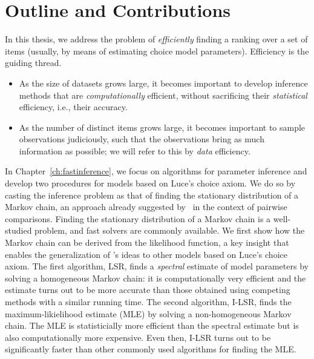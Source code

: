 \section{Outline and Contributions}
\label{in:sec:outline}

In this thesis, we address the problem of \emph{efficiently} finding a ranking over a set of items (usually, by means of estimating choice model parameters).
Efficiency is the guiding thread.
\begin{itemize}
\item As the size of datasets grows large, it becomes important to develop inference methods that are \emph{computationally} efficient, without sacrificing their \emph{statistical} efficiency, i.e., their accuracy.
\item As the number of distinct items grows large, it becomes important to sample observations judiciously, such that the observations bring as much information as possible; we will refer to this by \emph{data} efficiency.
\end{itemize}

In Chapter~\ref{ch:fastinference}, we focus on algorithms for parameter inference and develop two procedures for models based on Luce's choice axiom.
We do so by casting the inference problem as that of finding the stationary distribution of a Markov chain, an approach already suggested by~\citet{negahban2012iterative} in the context of pairwise comparisons.
Finding the stationary distribution of a Markov chain is a well-studied problem, and fast solvers are commonly available.
We first show how the Markov chain can be derived from the likelihood function, a key insight that enables the generalization of \citeauthor{negahban2012iterative}'s ideas to other models based on Luce's choice axiom.
The first algorithm, LSR, finds a \emph{spectral} estimate of model parameters by solving a homogeneous Markov chain: it is computationally very efficient and the estimate turns out to be more accurate than those obtained using competing methods with a similar running time.
The second algorithm, I-LSR, finds the maximum-likielihood estimate (MLE) by solving a non-homogeneous Markov chain.
The MLE is statisticially more efficient than the spectral estimate but is also computationally more expensive.
Even then, I-LSR turns out to be significantly faster than other commonly used algorithms for finding the MLE.

